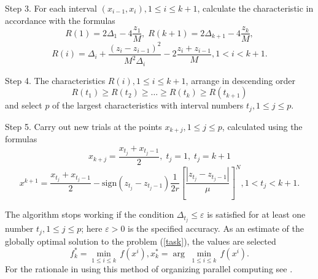 \documentclass{svproc}
\begin{document}
Step 3. For each interval \((x_{i-1},x_i),1\leqslant i\leqslant k+1\), calculate the characteristic in accordance with the formulas 
\begin{displaymath}
\label{step3_1}
R(1)=2\Delta_1-4\dfrac{z_1}{M}, \; R(k+1)=2\Delta_{k+1}-4\dfrac{z_k}{M},
\end{displaymath}
\begin{displaymath}
\label{step3_2}
R(i)=\Delta_i+\dfrac{(z_i-z_{i-1})^2}{M^2\Delta_i}-2\dfrac{z_i+z_{i-1}}{M},1<i<k+1.
\end{displaymath}

Step 4. The characteristics \(R(i),1\leqslant i\leqslant k+1\), arrange in descending order 
\begin{displaymath}
\label{step4}
R(t_1)\geqslant R(t_2)\geqslant \dots \geqslant R(t_{k})\geqslant R(t_{k+1})
\end{displaymath}
and select \(p\) of the largest characteristics with interval numbers \(t_j,1\leqslant j\leqslant p\).

Step 5. Carry out new trials at the points \(x_{k+j},1\leqslant j\leqslant p\), calculated using the formulas
\begin{displaymath}
x_{k+j}=\dfrac{x_{t_j}+x_{t_j-1}}{2},\; t_j=1, \; t_j=k+1
\end{displaymath}
\begin{displaymath}
\label{step5}
{{x}^{k+1}}=\frac{{{x}_{{{t}_{j}}}}+{{x}_{{{t}_{j}}-1}}}{2}-\text{sign}({{z}_{{{t}_{j}}}}-{{z}_{{{t}_{j}}-1}})\frac{1}{2r}{{\left[ \frac{|{{z}_{{{t}_{j}}}}-{{z}_{{{t}_{j}}-1}}|}{\mu } \right]}^{N}}, 1<{{t}_{j}}<k+1.
\end{displaymath}

The algorithm stops working if the condition \(\Delta_{t_j}\leqslant \varepsilon\)  is satisfied for at least one number \(t_j,1\leqslant j\leqslant p\); here \(\varepsilon>0\)  is the specified accuracy. As an estimate of the globally optimal solution to the problem (\ref{task}), the values are selected 
\begin{displaymath}
f_{k}^{*}=\underset{1\le i\le k}{\mathop{\min }}\,f({{x}^{i}}),   x_{k}^{*}=\arg \; \underset{1\le i\le k}{\mathop{\min }}\,f({{x}^{i}}).
\end{displaymath}
For the rationale in using this method of organizing parallel computing see \cite{Strongin2000}. 
\end{document}
